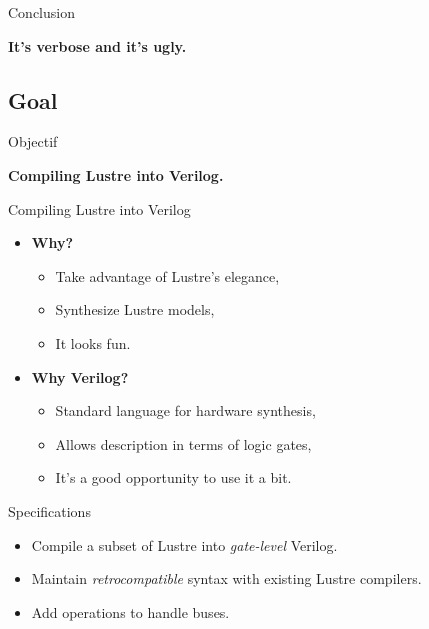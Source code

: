 \documentclass{beamer}
\begin{document}
\begin{frame}{Conclusion}
    \begin{LARGE}
        \begin{center}
            \bf
            It's verbose and it's ugly.
        \end{center}
    \end{LARGE}
\end{frame}

\subsection{Goal}

\begin{frame}{Objectif}
    \begin{LARGE}
        \begin{center}
            \bf
            Compiling Lustre into Verilog.
        \end{center}
    \end{LARGE}
\end{frame}

\begin{frame}{Compiling Lustre into Verilog}
    \begin{itemize}
        \item \textbf{Why?}
              \begin{itemize}
                  \item Take advantage of Lustre's elegance,
                  \item Synthesize Lustre models,
                  \item It looks fun.
              \end{itemize}
              \pause{}
        \item \textbf{Why Verilog?}
              \begin{itemize}
                  \item Standard language for hardware synthesis,
                  \item Allows description in terms of logic gates,
                  \item It's a good opportunity to use it a bit.
              \end{itemize}
    \end{itemize}
\end{frame}

\begin{frame}{Specifications}
    \begin{itemize}
        \item Compile a subset of Lustre into \emph{gate-level} Verilog.
        \item Maintain \emph{retrocompatible} syntax with existing Lustre compilers.
        \item Add operations to handle buses.
    \end{itemize}
\end{frame}
\end{document}
